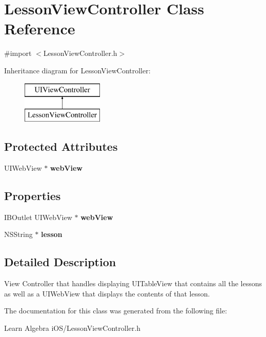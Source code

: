 \hypertarget{interface_lesson_view_controller}{\section{Lesson\-View\-Controller Class Reference}
\label{interface_lesson_view_controller}
}


{\ttfamily \#import $<$Lesson\-View\-Controller.\-h$>$}

Inheritance diagram for Lesson\-View\-Controller\-:\begin{figure}[H]
\begin{center}
\leavevmode
\includegraphics[height=2.000000cm]{interface_lesson_view_controller}
\end{center}
\end{figure}
\subsection*{Protected Attributes}
\begin{DoxyCompactItemize}
\item 
\hypertarget{interface_lesson_view_controller_a00c6a81257aa328b900674f418f73db0}{U\-I\-Web\-View $\ast$ {\bfseries web\-View}}\label{interface_lesson_view_controller_a00c6a81257aa328b900674f418f73db0}

\end{DoxyCompactItemize}
\subsection*{Properties}
\begin{DoxyCompactItemize}
\item 
\hypertarget{interface_lesson_view_controller_a18feab8e743c63e55ff3f54ca2d7bbee}{I\-B\-Outlet U\-I\-Web\-View $\ast$ {\bfseries web\-View}}\label{interface_lesson_view_controller_a18feab8e743c63e55ff3f54ca2d7bbee}

\item 
\hypertarget{interface_lesson_view_controller_a782e9228861c4ea263cfc8c80f17ad41}{N\-S\-String $\ast$ {\bfseries lesson}}\label{interface_lesson_view_controller_a782e9228861c4ea263cfc8c80f17ad41}

\end{DoxyCompactItemize}


\subsection{Detailed Description}
View Controller that handles displaying U\-I\-Table\-View that contains all the lessons as well as a U\-I\-Web\-View that displays the contents of that lesson. 

The documentation for this class was generated from the following file\-:\begin{DoxyCompactItemize}
\item 
Learn Algebra i\-O\-S/Lesson\-View\-Controller.\-h\end{DoxyCompactItemize}
